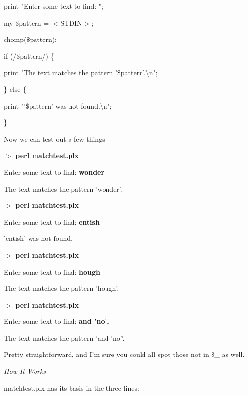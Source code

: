 \documentclass[a4paper,11pt]{book}
\begin{document}
\noindent 

\noindent print "Enter some text to find: ";

\noindent my \$pattern = $<$STDIN$>$;

\noindent chomp(\$pattern);

\noindent 

\noindent 

\noindent if (/\$pattern/) \{

\noindent print "The text matches the pattern '\$pattern'.\textbackslash n";

\noindent \} else \{

\noindent print "'\$pattern' was not found.\textbackslash n";

\noindent \}

\noindent 

\noindent Now we can test out a few things:

\noindent 

\noindent $>$ \textbf{perl matchtest.plx}

\noindent Enter some text to find: \textbf{wonder}

\noindent The text matches the pattern 'wonder'.

\noindent 

\noindent $>$ \textbf{perl matchtest.plx}

\noindent Enter some text to find: \textbf{entish}

\noindent 'entish' was not found.

\noindent 

\noindent $>$ \textbf{perl matchtest.plx}

\noindent Enter some text to find: \textbf{hough}

\noindent The text matches the pattern 'hough'.

\noindent 

\noindent $>$ \textbf{perl matchtest.plx}

\noindent Enter some text to find: \textbf{and 'no',}

\noindent The text matches the pattern 'and 'no''.

\noindent 

\noindent Pretty straightforward, and I'm sure you could all spot those not in \$\_ as well.

\noindent 

\noindent \textit{How It Works}

\noindent matchtest.plx has its basis in the three lines:
\end{document}
